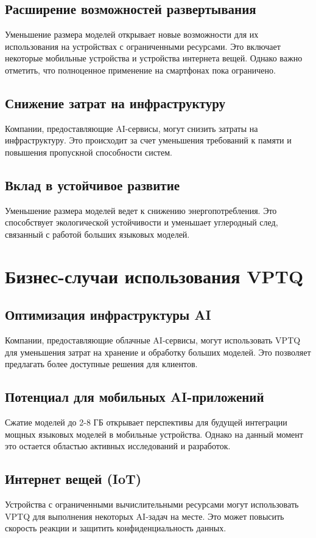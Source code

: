 \documentclass{article}
\begin{document}
\subsection{Расширение возможностей развертывания}
Уменьшение размера моделей открывает новые возможности для их использования на устройствах с ограниченными ресурсами. Это включает некоторые мобильные устройства и устройства интернета вещей. Однако важно отметить, что полноценное применение на смартфонах пока ограничено.

\subsection{Снижение затрат на инфраструктуру}
Компании, предоставляющие AI-сервисы, могут снизить затраты на инфраструктуру. Это происходит за счет уменьшения требований к памяти и повышения пропускной способности систем.

\subsection{Вклад в устойчивое развитие}
Уменьшение размера моделей ведет к снижению энергопотребления. Это способствует экологической устойчивости и уменьшает углеродный след, связанный с работой больших языковых моделей.

\section{Бизнес-случаи использования VPTQ}

\subsection{Оптимизация инфраструктуры AI}
Компании, предоставляющие облачные AI-сервисы, могут использовать VPTQ для уменьшения затрат на хранение и обработку больших моделей. Это позволяет предлагать более доступные решения для клиентов.

\subsection{Потенциал для мобильных AI-приложений}
Сжатие моделей до 2-8 ГБ открывает перспективы для будущей интеграции мощных языковых моделей в мобильные устройства. Однако на данный момент это остается областью активных исследований и разработок.

\subsection{Интернет вещей (IoT)}
Устройства с ограниченными вычислительными ресурсами могут использовать VPTQ для выполнения некоторых AI-задач на месте. Это может повысить скорость реакции и защитить конфиденциальность данных.
\end{document}
